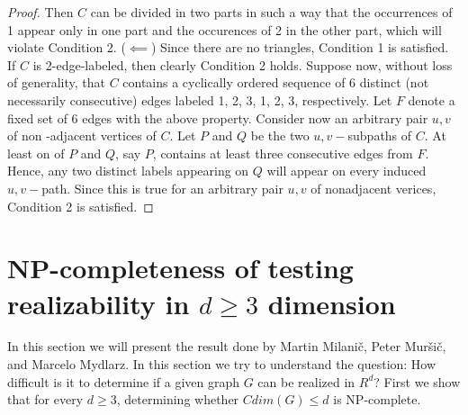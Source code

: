 \documentclass[12pt,a4paper,titlepage,openany]{report}
\begin{document}
\begin{proof}
Then $C$ can be divided in two parts in such a way that the occurrences of 1 appear only in one part and the occurences of 2 in the other part, which will violate Condition 2.\newline
($\impliedby$) Since there are no triangles, Condition 1 is satisfied. \newline
If $C$ is 2-edge-labeled, then clearly Condition 2 holds.\newline
Suppose now, without loss of generality, that $C$ contains a cyclically ordered sequence of 6 distinct (not necessarily consecutive) edges labeled 1, 2, 3, 1, 2, 3, respectively. Let $F$ denote a fixed set of 6 edges with the above property. Consider now an arbitrary pair $u,v$ of non -adjacent vertices of $C$. Let $P$ and $Q$ be the two $u,v-$subpaths of $C$. At least on of $P$ and $Q$, say $P$, contains at least three consecutive edges from $F$. Hence, any two distinct labels appearing on $Q$ will appear on every induced $u,v-$path. Since this is true for an arbitrary pair $u,v$ of nonadjacent verices, Condition 2 is satisfied.


\end{proof}

\section{NP-completeness of testing realizability in $d\geq 3$ dimension}
In this section we will present the result done by Martin Milani\v c, Peter Mur\v si\v c, and Marcelo Mydlarz.\newline
In this section we try to understand the question: How difficult is it to determine if a given graph $G$ can be realized in $R^d$?\newline
First we show that for every $d\geq 3$, determining whether $Cdim(G)\leq d$ is NP-complete.
\end{document}
